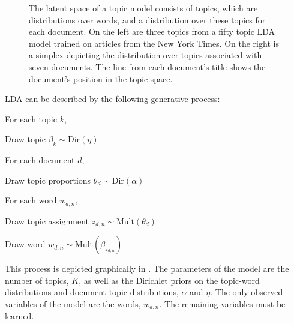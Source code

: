 \begin{figure}
{  \label{fig:nyttopics:doc}
}
\caption{The latent space of a topic model consists of topics,
  which are distributions over words, and a distribution over these
  topics for each document.  On the left are three topics from a
  fifty topic LDA model trained on articles from the New York
  Times.  On the right is a simplex depicting the distribution
  over topics associated with seven documents.  The line from each
  document's title shows the document's position in the topic
  space.}
\label{fig:nyttopics:big}
\end{figure}

LDA can be described by the following generative process:
\begin{enumerate*}
  \item For each topic $k$, 
    \begin{enumerate*}
    \item Draw topic $\beta_k \sim \mathrm{Dir}(\eta)$
    \end{enumerate*}
  \item For each document $d$, 
    \begin{enumerate*}
    \item Draw topic proportions $\theta_d \sim \mathrm{Dir}(\alpha)$
    \item For each word $w_{d, n}$, 
      \begin{enumerate*}
      \item Draw topic assignment $z_{d,n}\!\!\sim\!\!\mathrm{Mult}(\theta_d)$
      \item Draw word $w_{d,n} \sim \mathrm{Mult}(\beta_{z_{d,n}})$
      \end{enumerate*}
    \end{enumerate*}
\end{enumerate*}
This process is depicted graphically in .  The
parameters of the model are the number of topics, $K$, as well as the
Dirichlet priors on the topic-word distributions and document-topic
distributions, $\alpha$ and $\eta$.  The only observed variables of
the model are the words, $w_{d,n}$.  The remaining variables must be
learned.


